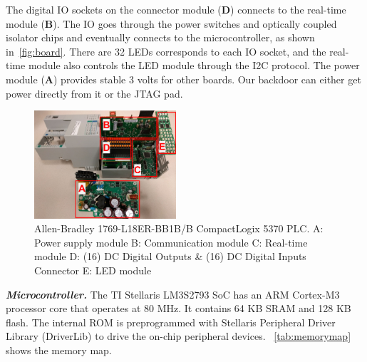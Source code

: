 The digital IO sockets on the connector module (\textbf{D}) connects to the real-time module (\textbf{B}). The IO goes through the power switches and optically coupled isolator chips and eventually connects to the microcontroller, as shown in~\autoref{fig:board}. There are 32 LEDs corresponds to each IO socket, and the real-time module also controls the LED module through the I2C protocol. The power module (\textbf{A}) provides stable 3 volts for other boards. Our backdoor can either get power directly from it or the JTAG pad.

\begin{figure}[th]
	\includegraphics[width=0.47\textwidth]{figures/modules}
	\centering
	\caption{Allen-Bradley 1769-L18ER-BB1B/B CompactLogix 5370 PLC. A: Power supply module  B: Communication module  C: Real-time module  D: (16) DC Digital Outputs \& (16) DC Digital Inputs Connector  E: LED  module}
	\label{fig:modules}
\end{figure}




\textbf{\textit{Microcontroller.}} The TI Stellaris LM3S2793 SoC has an ARM Cortex-M3 processor core that operates at 80 MHz. It contains 64 KB SRAM and 128 KB flash. The internal ROM is preprogrammed with Stellaris Peripheral Driver Library (DriverLib) to drive the on-chip peripheral devices. ~\autoref{tab:memorymap} shows the memory map. 


